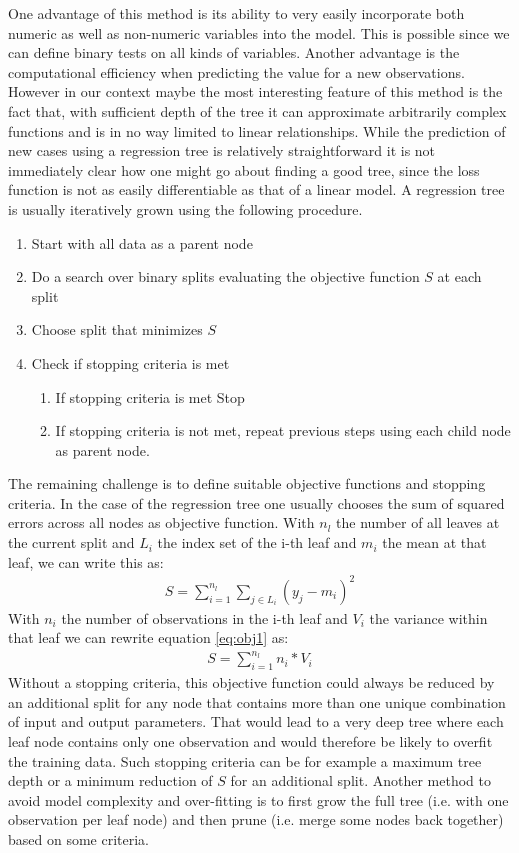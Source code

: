 One advantage of this method is its ability to very easily incorporate both numeric as well as non-numeric variables into the model. This is possible since we can define binary tests on all kinds of variables. Another advantage is the computational efficiency when predicting the value for a new observations. However in our context maybe the most interesting feature of this method is the fact that, with sufficient depth of the tree it can approximate arbitrarily complex functions and is in no way limited to linear relationships. While the prediction of new cases using a regression tree is relatively straightforward it is not immediately clear how one might go about finding a good tree, since the loss function is not as easily differentiable as that of a linear model. A regression tree is usually iteratively grown using the following procedure.
\begin{enumerate}
\item Start with all data as a parent node
\item Do a search over binary splits evaluating the objective function $S$ at each split
\item Choose split that minimizes $S$
\item Check if stopping criteria is met
\begin{enumerate}
	\item If stopping criteria is met Stop
	\item If stopping criteria is not met, repeat previous steps using each child node as parent node.
\end{enumerate}
\end{enumerate}
The remaining challenge is to define suitable objective functions and stopping criteria. In the case of the regression tree one usually chooses the sum of squared errors across all nodes as objective function. With $n_l$ the number of all leaves at the current split and $L_i$ the index set of the i-th leaf and $m_i$ the mean at that leaf, we can write this as:
\begin{align}
S = \sum_{i = 1}^{n_l} \sum_{j \in L_i} (y_j - m_i)^2 \label{eq:obj1}
\end{align}
With $n_i$ the number of observations in the i-th leaf and $V_i$ the variance within that leaf we can rewrite equation \ref{eq:obj1} as:
\begin{align}
S = \sum_{i = 1}^{n_l}n_i * V_i
\end{align}
Without a stopping criteria, this objective function could always be reduced by an additional split for any node that contains more than one unique combination of input and output parameters. That would lead to a very deep tree where each leaf node contains only one observation and would therefore be likely to overfit the training data. Such stopping criteria can be for example a maximum tree depth or a minimum reduction of $S$ for an additional split. Another method to avoid model complexity and over-fitting is to first grow the full tree (i.e. with one observation per leaf node) and then prune (i.e. merge some nodes back together) based on some criteria.
